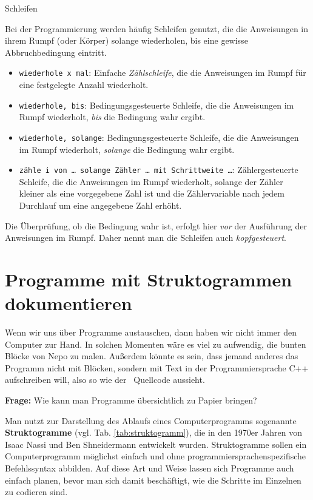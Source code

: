 \begin{zsfg}{Schleifen}
	
	Bei der Programmierung werden häufig Schleifen genutzt, die die Anweisungen in ihrem Rumpf (oder Körper) solange wiederholen, bis eine gewisse Abbruchbedingung eintritt.
	
	\begin{itemize}[itemsep=0ex, parsep=0ex]
		\item \texttt{wiederhole x mal}: Einfache \emph{Zählschleife}, die die Anweisungen im Rumpf für eine festgelegte Anzahl wiederholt.
		\item \texttt{wiederhole, bis}: Bedingungsgesteuerte Schleife, die die Anweisungen im Rumpf wiederholt, \emph{bis} die Bedingung wahr ergibt.
		\item \texttt{wiederhole, solange}: Bedingungsgesteuerte Schleife, die die Anweisungen im Rumpf wiederholt, \emph{solange} die Bedingung wahr ergibt.
		\item \texttt{zähle i von \dots ~solange Zähler \dots ~mit Schrittweite \dots}: Zählergesteuerte Schleife, die die Anweisungen im Rumpf wiederholt, solange der Zähler kleiner als eine vorgegebene Zahl ist und die Zählervariable nach jedem Durchlauf um eine angegebene Zahl erhöht.
	\end{itemize}
		
	Die Überprüfung, ob die Bedingung wahr ist, erfolgt hier \emph{vor} der Ausführung der Anweisungen im Rumpf. Daher nennt man die Schleifen auch \emph{kopfgesteuert}.
\end{zsfg}


\newpage
\section{Programme mit Struktogrammen dokumentieren}
\label{sec:struktogramme}

Wenn wir uns über Programme austauschen, dann haben wir nicht immer den Computer zur Hand. In solchen Momenten wäre es viel zu aufwendig, die bunten Blöcke von Nepo zu malen. Außerdem könnte es sein, dass jemand anderes das Programm nicht mit Blöcken, sondern mit Text in der Programmiersprache C++ aufschreiben will, also so wie der ~\nepoquellcode Quellcode aussieht.

\begin{ziel}
	\textbf{Frage:} Wie kann man Programme übersichtlich zu Papier bringen?
\end{ziel}

Man nutzt zur Darstellung des Ablaufs eines Computerprogramms sogenannte \textbf{Struktogramme} (vgl. Tab. \ref{tab:struktogramm}), die in den 1970er Jahren von Isaac Nassi und Ben Shneidermann entwickelt wurden. Struktogramme sollen ein Computerprogramm möglichst einfach und ohne programmiersprachenspezifische Befehlssyntax abbilden. Auf diese Art und Weise lassen sich Programme auch einfach planen, bevor man sich damit beschäftigt, wie die Schritte im Einzelnen zu codieren sind.


